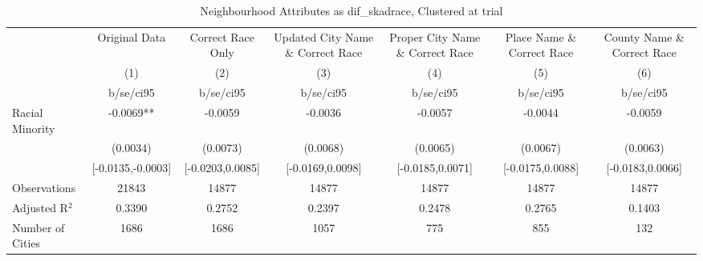 \documentclass{article}
\begin{document}
\begin{table}[htbp]\centering
\def\sym#1{\ifmmode^{#1}\else\(^{#1}\)\fi}
\caption{Neighbourhood Attributes as dif\_skadrace, Clustered at trial}
\begin{tabular}{l*{6}{c}}
\toprule
                    &\multicolumn{1}{c}{Original Data}&\multicolumn{1}{c}{Correct Race Only}&\multicolumn{1}{c}{Updated City Name \& Correct Race}&\multicolumn{1}{c}{Proper City Name \& Correct Race}&\multicolumn{1}{c}{Place Name \& Correct Race}&\multicolumn{1}{c}{County Name \& Correct Race}\\\cmidrule(lr){2-2}\cmidrule(lr){3-3}\cmidrule(lr){4-4}\cmidrule(lr){5-5}\cmidrule(lr){6-6}\cmidrule(lr){7-7}
                    &\multicolumn{1}{c}{(1)}   &\multicolumn{1}{c}{(2)}   &\multicolumn{1}{c}{(3)}   &\multicolumn{1}{c}{(4)}   &\multicolumn{1}{c}{(5)}   &\multicolumn{1}{c}{(6)}   \\
                    &   b/se/ci95   &   b/se/ci95   &   b/se/ci95   &   b/se/ci95   &   b/se/ci95   &   b/se/ci95   \\
\midrule
Racial Minority     &     -0.0069** &     -0.0059   &     -0.0036   &     -0.0057   &     -0.0044   &     -0.0059   \\
                    &    (0.0034)   &    (0.0073)   &    (0.0068)   &    (0.0065)   &    (0.0067)   &    (0.0063)   \\
                    &[-0.0135,-0.0003]   &[-0.0203,0.0085]   &[-0.0169,0.0098]   &[-0.0185,0.0071]   &[-0.0175,0.0088]   &[-0.0183,0.0066]   \\
\midrule
Observations        &       21843   &       14877   &       14877   &       14877   &       14877   &       14877   \\
Adjusted R$^2$      &      0.3390   &      0.2752   &      0.2397   &      0.2478   &      0.2765   &      0.1403   \\
Number of Cities    &        1686   &        1686   &        1057   &         775   &         855   &         132   \\
\bottomrule
\end{tabular}
\end{table}
\end{document}
